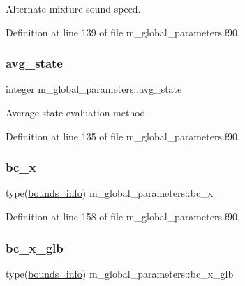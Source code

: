 Alternate mixture sound speed. 



Definition at line 139 of file m\+\_\+global\+\_\+parameters.\+f90.

\mbox{\label{namespacem__global__parameters_a1a3314b39e21e17d7e72a9837db2ab42}} 
\subsubsection{\texorpdfstring{avg\+\_\+state}{avg\_state}}
{\footnotesize\ttfamily integer m\+\_\+global\+\_\+parameters\+::avg\+\_\+state}



Average state evaluation method. 



Definition at line 135 of file m\+\_\+global\+\_\+parameters.\+f90.

\mbox{\label{namespacem__global__parameters_aa46a7f3638e49fa9ec33ea859b9e6a5a}} 
\subsubsection{\texorpdfstring{bc\+\_\+x}{bc\_x}}
{\footnotesize\ttfamily type(\hyperlink{structm__derived__types_1_1bounds__info}{bounds\+\_\+info}) m\+\_\+global\+\_\+parameters\+::bc\+\_\+x}



Definition at line 158 of file m\+\_\+global\+\_\+parameters.\+f90.

\mbox{\label{namespacem__global__parameters_a18f8ba3144b698c2753731b6e27fc581}} 
\subsubsection{\texorpdfstring{bc\+\_\+x\+\_\+glb}{bc\_x\_glb}}
{\footnotesize\ttfamily type(\hyperlink{structm__derived__types_1_1bounds__info}{bounds\+\_\+info}) m\+\_\+global\+\_\+parameters\+::bc\+\_\+x\+\_\+glb}



